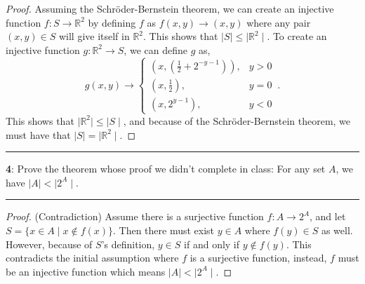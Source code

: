 \documentclass[11pt]{article}
\newcommand\question[2]{\vspace{.25in}\hrule\textbf{#1}: #2\vspace{.5em}\hrule\vspace{.10in}}
\newcommand{\R}{\mathbb{R}}
\begin{document}
\begin{proof}
	Assuming the Schröder-Bernstein theorem, we can create an injective function $f:S \rightarrow \R^2$ by defining $f$ as $f(x,y) \rightarrow (x,y)$ where any pair $(x,y) \in S$ will give itself in $\R^2$. This shows that $\mid S \mid \le \mid \R^2 \mid$. To create an injective function $g : \R^2 \rightarrow S$, we can define $g$ as,
	\begin{equation*}
		g(x,y) \rightarrow
		\begin{cases}
			\left(x,\left(\frac{1}{2} + 2^{-y-1}\right)\right) , & y > 0\\
			\left(x,\frac{1}{2}\right), & y = 0\\
			\left(x, 2^{y-1}\right), & y < 0
		\end{cases}\,.
	\end{equation*}
	This shows that $\mid \R^2 \mid \le \mid S \mid$, and because of the Schröder-Bernstein theorem, we must have that $\mid S \mid = \mid \R^2 \mid$.
\end{proof}

\question{4}{Prove the theorem whose proof we didn't complete in class: For any set $A$, we have $\mid A \mid < \mid 2^A \mid$.}

\begin{proof}
	(Contradiction) Assume there is a surjective function $f: A \rightarrow 2^A$, and let $S=\{x \in A \mid x \not\in f(x)\}$. Then there must exist $y \in A$ where $f(y) \in S$ as well. However, because of $S$'s definition, $y \in S$ if and only if $y \not\in f(y)$. This contradicts the initial assumption where $f$ is a surjective function, instead, $f$ must be an injective function which means $\mid A \mid < \mid 2^A \mid.$
\end{proof}

	
\end{document}
